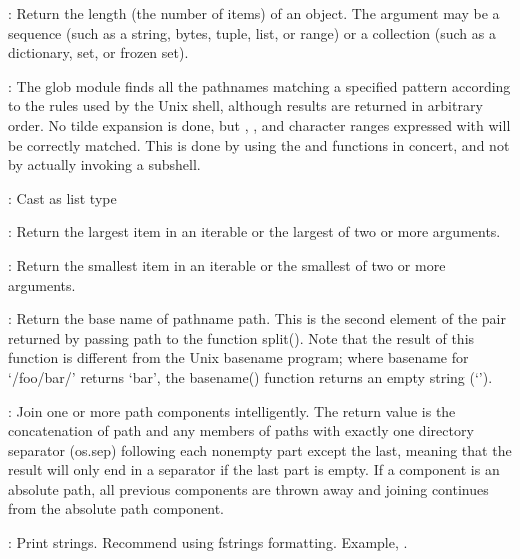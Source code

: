 \documentclass[letterpaper,10pt,english]{sphinxmanual}
\begin{document}
: Return the length (the number of items) of an object. The argument may be a sequence (such as a string, bytes, tuple, list, or range) or a collection (such as a dictionary, set, or frozen set).

: The glob module finds all the pathnames matching a specified pattern according to the rules used by the Unix shell, although results are returned in arbitrary order. No tilde expansion is done, but \sphinxcode{\sphinxupquote{*}}, , and character ranges expressed with \sphinxcode{\sphinxupquote{{[}{]}}} will be correctly matched. This is done by using the  and  functions in concert, and not by actually invoking a subshell.

: Cast as list type

: Return the largest item in an iterable or the largest of two or more arguments.

: Return the smallest item in an iterable or the smallest of two or more arguments.

: Return the base name of pathname path. This is the second element of the pair returned by passing path to the function split(). Note that the result of this function is different from the Unix basename program; where basename for ‘/foo/bar/’ returns ‘bar’, the basename() function returns an empty string (‘’).

: Join one or more path components intelligently. The return value is the concatenation of path and any members of paths with exactly one directory separator (os.sep) following each non\sphinxhyphen{}empty part except the last, meaning that the result will only end in a separator if the last part is empty. If a component is an absolute path, all previous components are thrown away and joining continues from the absolute path component.

: Print strings. Recommend using f\sphinxhyphen{}strings formatting. Example, .
\end{document}
